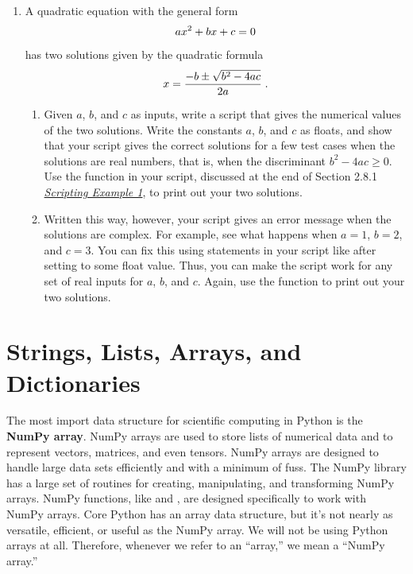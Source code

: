 \documentclass[letterpaper,10pt,english]{sphinxmanual}
\begin{document}
\begin{enumerate}
\item {} 
A quadratic equation with the general form
\begin{gather}
\begin{split}ax^2+bx+c=0\end{split}\notag
\end{gather}
has two solutions given by the quadratic formula
\begin{gather}
\begin{split}x = \frac{-b \pm \sqrt{b^2-4ac}}{2a} \;.\end{split}\notag
\end{gather}\begin{enumerate}
\item {} 
Given $a$, $b$, and $c$ as inputs, write a script that gives the numerical values of the two solutions.  Write the constants $a$, $b$, and $c$ as floats, and show that your script gives the correct solutions for a few test cases when the solutions are real numbers, that is, when the discriminant $b^2-4ac \ge 0$.  Use the  function in your script, discussed at the end of Section 2.8.1 {\hyperref[chap2/chap2_basics:chap2-scriptexmp1]{\emph{Scripting Example 1}}}, to print out your two solutions.

\item {} 
Written this way, however, your script gives an error message when the solutions are complex.  For example, see what happens when $a=1$, $b=2$, and $c=3$.  You can fix this using statements in your script like  after setting  to some float value.  Thus, you can make the script work for any set of real inputs for $a$, $b$, and $c$.  Again, use the  function to print out your two solutions.

\end{enumerate}

\end{enumerate}


\chapter{Strings, Lists, Arrays, and Dictionaries}
\label{chap3/chap3_arrays:chap3}\label{chap3/chap3_arrays:strings-lists-arrays-and-dictionaries}\label{chap3/chap3_arrays::doc}
The most import data structure for scientific computing in Python is the \textbf{NumPy array}.  NumPy arrays are used to store lists of numerical data and to represent vectors, matrices, and even tensors.  NumPy arrays are designed to handle large data sets efficiently and with a minimum of fuss.  The NumPy library has a large set of routines for creating, manipulating, and transforming NumPy arrays.  NumPy functions, like  and , are designed specifically to work with NumPy arrays.  Core Python has an array data structure, but it's not nearly as versatile, efficient, or useful as the NumPy array.  We will not be using Python arrays at all.  Therefore, whenever we refer to an ``array,'' we mean a ``NumPy array.''
\end{document}
